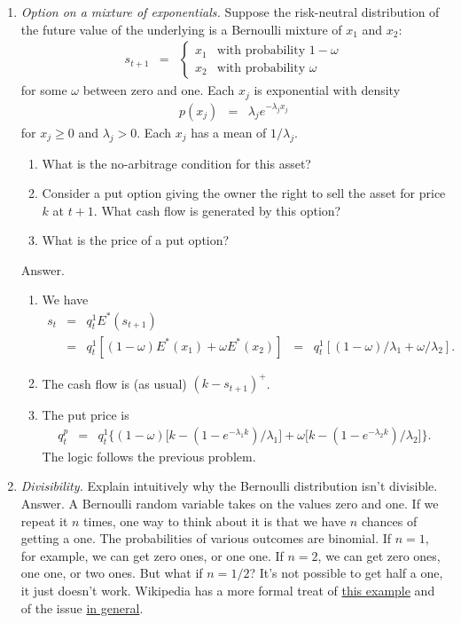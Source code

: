 \documentclass[11pt]{article}
\begin{document}
\begin{enumerate}
\item {\it Option on a mixture of exponentials.\/}
Suppose the risk-neutral distribution of the future value of the underlying
is a Bernoulli mixture of $x_1$ and $x_2$:
\begin{eqnarray*}
    s_{t+1} &=&
        \left\{
        \begin{array}{ll}
            x_1 & \mbox{with probability } 1-\omega \\
            x_2 & \mbox{with probability } \omega
        \end{array}
        \right.
\end{eqnarray*}
for some $\omega$ between zero and one.
Each $x_j$ is exponential with density
\begin{eqnarray*}
    p(x_j) &=& \lambda_j e^{-\lambda_j x_j}
\end{eqnarray*}
for $x_j \geq 0$ and $\lambda_j > 0$.
Each $x_j$ has a mean of $1/\lambda_j$.
%
\begin{enumerate}
\item What is the no-arbitrage condition for this asset?
\item Consider a put option giving the owner the right to sell
the asset for price $k$ at $t+1$.
What cash flow is generated by this option?
\item What is the price of a put option?
\end{enumerate}
%
Answer.
\begin{enumerate}
\item We have
\begin{eqnarray*}
    s_t &=& q^1_t E^* (s_{t+1}) \\
            &=& q^1_t [(1-\omega) E^*(x_1) + \omega E^*(x_2)]
            \;\;=\;\; q^1_t [(1-\omega)/\lambda_1 + \omega /\lambda_2] .
\end{eqnarray*}
\item The cash flow is (as usual) $ (k-s_{t+1})^+ $.
\item The put price is
\begin{eqnarray*}
    q^p_t &=& q^1_t \Big\{
        (1-\omega) \big[ k - ( 1-e^{-\lambda_1 k})/\lambda_1 \big]
        + \omega \big[ k - ( 1-e^{-\lambda_2 k})/\lambda_2 \big]
        \Big\} .
\end{eqnarray*}
The logic follows the previous problem.
\end{enumerate}


\item {\it Divisibility.\/} Explain intuitively why the Bernoulli distribution isn't divisible.
%
Answer. A Bernoulli random variable takes on the values zero and one.
If we repeat it $n$ times, one way to think about it is that
we have $n$ chances of getting a one.
The probabilities of various outcomes are binomial.
If $n=1$, for example, we can get zero ones, or one one.
If $n=2$, we can get zero ones, one one, or two ones.
But what if $n=1/2$?
It's not possible to get half a one, it just doesn't work.
Wikipedia has a more formal treat of
\href{http://en.wikipedia.org/wiki/Indecomposable_distribution}{this example}
and of the issue
\href{http://en.wikipedia.org/wiki/Infinite_divisibility_(probability)}
{in general}.



\end{enumerate}
\end{document}
